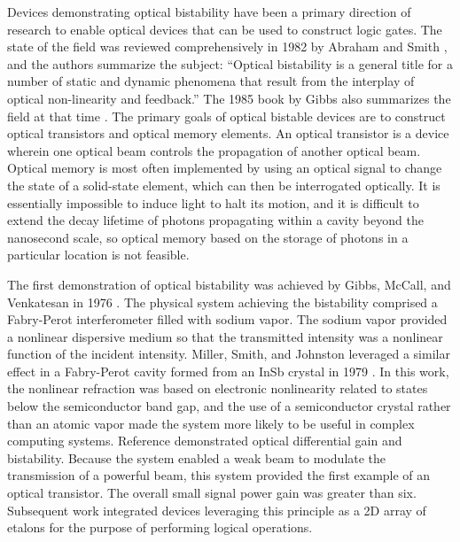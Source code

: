 Devices demonstrating optical bistability have been a primary direction of research to enable optical devices that can be used to construct logic gates. The state of the field was reviewed comprehensively in 1982 by Abraham and Smith \cite{abms1982}, and the authors summarize the subject: ``Optical bistability is a general title for a number of static and dynamic phenomena that result from the interplay of optical non-linearity and feedback.'' The 1985 book by Gibbs also summarizes the field at that time \cite{gi1985}. The primary goals of optical bistable devices are to construct optical transistors and optical memory elements. An optical transistor is a device wherein one optical beam controls the propagation of another optical beam. Optical memory is most often implemented by using an optical signal to change the state of a solid-state element, which can then be interrogated optically. It is essentially impossible to induce light to halt its motion, and it is difficult to extend the decay lifetime of photons propagating within a cavity beyond the nanosecond scale, so optical memory based on the storage of photons in a particular location is not feasible.

The first demonstration of optical bistability was achieved by Gibbs, McCall, and Venkatesan in 1976 \cite{gimc1976}. The physical system achieving the bistability comprised a Fabry-Perot interferometer filled with sodium vapor. The sodium vapor provided a nonlinear dispersive medium so that the transmitted intensity was a nonlinear function of the incident intensity. Miller, Smith, and Johnston leveraged a similar effect in a Fabry-Perot cavity formed from an InSb crystal in 1979 \cite{mism1979}. In this work, the nonlinear refraction was based on electronic nonlinearity related to states below the semiconductor band gap, and the use of a semiconductor crystal rather than an atomic vapor made the system more likely to be useful in complex computing systems. Reference  demonstrated optical differential gain and bistability. Because the system enabled a weak beam to modulate the transmission of a powerful beam, this system provided the first example of an optical transistor. The overall small signal power gain was greater than six. Subsequent work integrated devices leveraging this principle as a 2D array of etalons \cite{jele1986,vewi1986} for the purpose of performing logical operations. 

